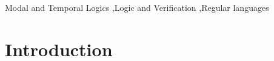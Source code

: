 \documentclass[preprint,12pt]{elsarticle}
\theoremstyle{definition}
\theoremstyle{remark}
\begin{document}
\begin{frontmatter}
    \begin{keyword}
        Modal and Temporal Logics
        \sep Logic and Verification
        \sep Regular languages
    \end{keyword}
\end{frontmatter}

\section{Introduction}

%          
%
%          
%
%
%          
%
%
%
\end{document}
